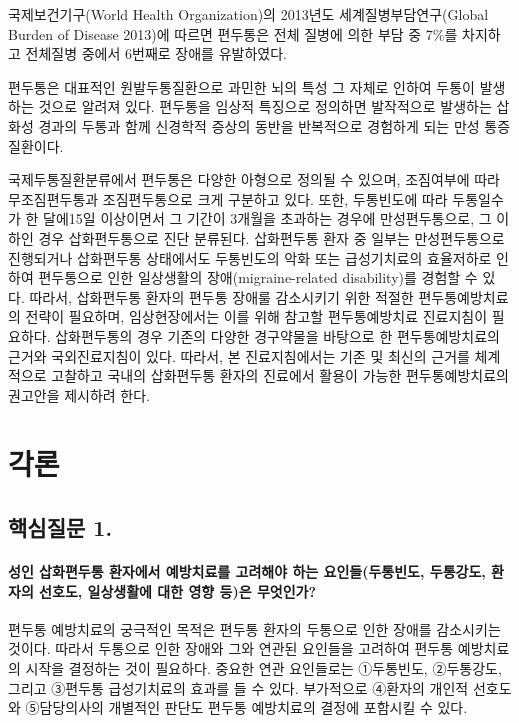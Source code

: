 \documentclass[]{book}
\begin{document}
국제보건기구(World Health Organization)의 2013년도 세계질병부담연구(Global Burden of Disease 2013)에 따르면 편두통은 전체 질병에 의한 부담 중 7\%를 차지하고 전체질병 중에서 6번째로 장애를 유발하였다.

편두통은 대표적인 원발두통질환으로 과민한 뇌의 특성 그 자체로 인하여 두통이 발생하는 것으로 알려져 있다. 편두통을 임상적 특징으로 정의하면 발작적으로 발생하는 삽화성 경과의 두통과 함께 신경학적 증상의 동반을 반복적으로 경험하게 되는 만성 통증질환이다.

국제두통질환분류에서 편두통은 다양한 아형으로 정의될 수 있으며, 조짐여부에 따라 무조짐편두통과 조짐편두통으로 크게 구분하고 있다. 또한, 두통빈도에 따라 두통일수가 한 달에15일 이상이면서 그 기간이 3개월을 초과하는 경우에 만성편두통으로, 그 이하인 경우 삽화편두통으로 진단 분류된다. 삽화편두통 환자 중 일부는 만성편두통으로 진행되거나 삽화편두통 상태에서도 두통빈도의 악화 또는 급성기치료의 효율저하로 인하여 편두통으로 인한 일상생활의 장애(migraine-related disability)를 경험할 수 있다. 따라서, 삽화편두통 환자의 편두통 장애룰 감소시키기 위한 적절한 편두통예방치료의 전략이 필요하며, 임상현장에서는 이를 위해 참고할 편두통예방치료 진료지침이 필요하다. 삽화편두통의 경우 기존의 다양한 경구약물을 바탕으로 한 편두통예방치료의 근거와 국외진료지침이 있다. 따라서, 본 진료지침에서는 기존 및 최신의 근거를 체계적으로 고찰하고 국내의 삽화편두통 환자의 진료에서 활용이 가능한 편두통예방치료의 권고안을 제시하려 한다.

\hypertarget{section-7}{%
\chapter{각론}\label{section-7}}

\hypertarget{section-8}{%
\section{핵심질문 1.}\label{section-8}}

\hypertarget{section-9}{%
\subsubsection*{성인 삽화편두통 환자에서 예방치료를 고려해야 하는 요인들(두통빈도, 두통강도, 환자의 선호도, 일상생활에 대한 영향 등)은 무엇인가?}\label{section-9}}

편두통 예방치료의 궁극적인 목적은 편두통 환자의 두통으로 인한 장애를 감소시키는 것이다. 따라서 두통으로 인한 장애와 그와 연관된 요인들을 고려하여 편두통 예방치료의 시작을 결정하는 것이 필요하다. 중요한 연관 요인들로는 ①두통빈도, ②두통강도, 그리고 ③편두통 급성기치료의 효과를 들 수 있다. 부가적으로 ④환자의 개인적 선호도와 ⑤담당의사의 개별적인 판단도 편두통 예방치료의 결정에 포함시킬 수 있다.
\end{document}
